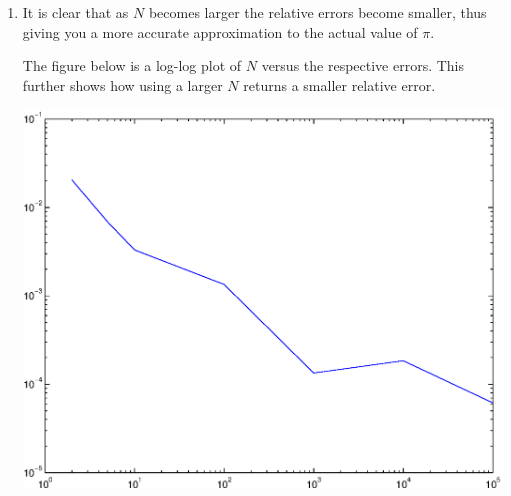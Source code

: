 \documentclass[paper=a4, fontsize=11pt]{scrartcl} %
\numberwithin{equation}{section} %
\numberwithin{figure}{section} %
\numberwithin{table}{section} %
\begin{document}
\begin{enumerate}
\item
\begin{flushleft}
It is clear that as $N$ becomes larger the relative errors become smaller, thus giving you a more accurate approximation to the actual value of $\pi$.  

The figure below is a log-log plot of $N$ versus the respective errors.  This further shows how using a larger $N$ returns a smaller relative error.  
\end{flushleft}

\includegraphics [scale=0.8] {log_plot.eps}




\end{enumerate}


\end{document}
